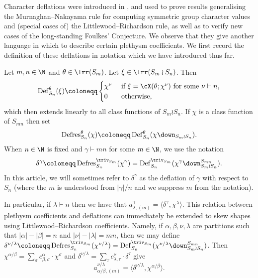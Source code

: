 Character deflations were introduced in \cite[Definition 1.1]{EPW}, and used to prove results generalising the Murnaghan--Nakayama rule for computing symmetric group character values and (special cases of) the Littlewood--Richardson rule, as well as to verify new cases of the long-standing Foulkes' Conjecture. We observe that they give another language in which to describe certain plethysm coefficients. We first record the definition of these deflations in notation which we have introduced thus far.
\begin{definition}\label{def:deflation}
	Let $m,n\in\N$ and $\theta\in\Irr(S_m)$. Let $\xi\in\Irr(S_m\wr S_n)$. Then 
	\[ \operatorname{Def}^\theta_{S_n}(\xi) \coloneqq  \begin{cases}
		\chi^\nu & \text{ if }\xi = \cX(\theta;\chi^\nu)\text{ for some }\nu\vdash n,\\
		0 & \text{ otherwise},
	\end{cases} \]
	which then extends linearly to all class functions of $S_m\wr S_n$. If $\chi$ is a class function of $S_{mn}$ then set
	\[ \operatorname{Defres}^\theta_{S_n}(\chi) \coloneqq  \operatorname{Def}^\theta_{S_n}(\chi\down_{S_m\wr S_n}). \]
	When $n\in\N$ is fixed and $\gamma\vdash mn$ for some $m\in\N$, we use the notation
	\[ \delta^\gamma\coloneqq \operatorname{Defres}^{\triv_{S_m}}_{S_n}(\chi^\gamma) = \operatorname{Def}^{\triv_{S_m}}_{S_n}(\chi^\gamma\down^{S_{mn}}_{S_m\wr S_n}). \]
	In this article, we will sometimes refer to $\delta^\gamma$ as the deflation of $\gamma$ with respect to $S_n$ \textup{(}where the $m$ is understood from $|\gamma|/n$ and we suppress $m$ from the notation\textup{)}.
\end{definition}
In particular, if $\lambda\vdash n$ then we have that $a^\gamma_{\lambda,(m)} = \langle \delta^\gamma,\chi^\lambda \rangle$. This relation between plethysm coefficients and deflations can immediately be extended to skew shapes using Littlewood--Richardson coefficients. Namely, if $\alpha,\beta,\nu,\lambda$ are partitions such that $|\alpha|-|\beta|=n$ and $|\nu|-|\lambda|=mn$, then we may define $\delta^{\nu/\lambda}\coloneqq \operatorname{Defres}^{\triv_{S_m}}_{S_n}(\chi^{\nu/\lambda}) = \operatorname{Def}^{\triv_{S_m}}_{S_n}(\chi^{\nu/\lambda}\down^{S_{mn}}_{S_m\wr S_n})$. Then $\chi^{\alpha/\beta}=\sum_\sigma c^\alpha_{\beta,\sigma}\cdot \chi^\sigma$ and $\delta^{\nu/\lambda}=\sum_\tau c^\nu_{\lambda,\tau}\cdot \delta^\tau$ give
\begin{equation}\label{eqn:plethysm-deflation-skew}
	a^{\nu/\lambda}_{\alpha/\beta,(m)} = \langle \delta^{\nu/\lambda}, \chi^{\alpha/\beta}\rangle.
\end{equation}

